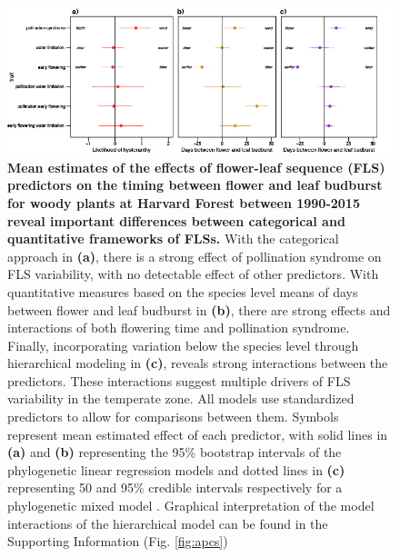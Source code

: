 \documentclass[11pt]{article}
\begin{document}
\pagebreak  

 \begin{figure}[h!]
        \centering
         \includegraphics[width=\textwidth]{..//..//HFmodelplots.jpg}
          \caption{\textbf{Mean estimates of the effects of flower-leaf sequence (FLS) predictors on the timing between flower and leaf budburst for woody plants at Harvard Forest between 1990-2015 reveal important differences between categorical and quantitative frameworks of FLSs.}  With the categorical approach in \textbf{(a)}, there is a strong effect of  pollination syndrome on FLS variability, with no detectable effect of other predictors. With quantitative measures based on the species level means of days between flower and leaf budburst in \textbf{(b)}, there are strong effects and interactions of both flowering time and pollination syndrome. Finally, incorporating variation below the species level through hierarchical modeling in \textbf{(c)}, reveals strong interactions between the predictors. These interactions suggest multiple drivers of FLS variability in the temperate zone.  All models use standardized predictors to allow for comparisons between them. Symbols represent mean estimated effect of each predictor, with solid lines in \textbf{(a)} and \textbf{(b)} representing the 95\% bootstrap intervals of the phylogenetic linear regression models \citep{Ives2010} and dotted lines in \textbf{(c)} representing 50 and 95\% credible intervals respectively for a phylogenetic mixed model \citep{Garamszegi2014}. Graphical interpretation of the model interactions of the hierarchical model can be found in the Supporting Information (Fig. \ref{fig:apcs})}  
        \label{fig:muplots.HF}
    \end{figure}    


    
\end{document}
